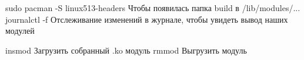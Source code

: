 sudo pacman -S linux513-headers
	Чтобы появилась папка build в /lib/modules/...
journalctl -f
	Отслеживание изменений в журнале, чтобы увидеть вывод наших модулей

insmod
	Загрузить собранный .ko модуль
rmmod
	Выгрузить модуль
